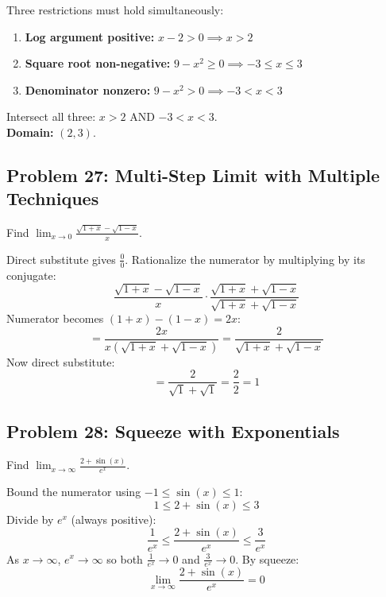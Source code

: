 \documentclass[11pt, letterpaper]{article}
\begin{document}
\begin{tcolorbox}[colback=examplebg, colframe=exampleborder,
  title={\bfseries Solution}, arc=3pt, boxrule=1pt]
Three restrictions must hold simultaneously:
\begin{enumerate}[noitemsep]
  \item \textbf{Log argument positive:} $x - 2 > 0 \implies x > 2$
  \item \textbf{Square root non-negative:} $9 - x^2 \geq 0 \implies -3 \leq x \leq 3$
  \item \textbf{Denominator nonzero:} $9 - x^2 > 0 \implies -3 < x < 3$
\end{enumerate}
Intersect all three: $x > 2$ AND $-3 < x < 3$.\\[3pt]
\textbf{Domain:} $(2, 3)$.
\end{tcolorbox}

\subsection*{Problem 27: Multi-Step Limit with Multiple Techniques}

Find $\displaystyle \lim_{x \to 0} \frac{\sqrt{1 + x} - \sqrt{1 - x}}{x}$.

\begin{tcolorbox}[colback=examplebg, colframe=exampleborder,
  title={\bfseries Solution}, arc=3pt, boxrule=1pt]
Direct substitute gives $\tfrac{0}{0}$. Rationalize the numerator by multiplying by its conjugate:
\[
\frac{\sqrt{1+x} - \sqrt{1-x}}{x} \cdot \frac{\sqrt{1+x} + \sqrt{1-x}}{\sqrt{1+x} + \sqrt{1-x}}
\]
Numerator becomes $(1+x) - (1-x) = 2x$:
\[
= \frac{2x}{x(\sqrt{1+x} + \sqrt{1-x})} = \frac{2}{\sqrt{1+x} + \sqrt{1-x}}
\]
Now direct substitute:
\[
= \frac{2}{\sqrt{1} + \sqrt{1}} = \frac{2}{2} = 1
\]
\end{tcolorbox}

\subsection*{Problem 28: Squeeze with Exponentials}

Find $\displaystyle \lim_{x \to \infty} \frac{2 + \sin(x)}{e^x}$.

\begin{tcolorbox}[colback=examplebg, colframe=exampleborder,
  title={\bfseries Solution}, arc=3pt, boxrule=1pt]
Bound the numerator using $-1 \leq \sin(x) \leq 1$:
\[
1 \leq 2 + \sin(x) \leq 3
\]
Divide by $e^x$ (always positive):
\[
\frac{1}{e^x} \leq \frac{2 + \sin(x)}{e^x} \leq \frac{3}{e^x}
\]
As $x \to \infty$, $e^x \to \infty$ so both $\tfrac{1}{e^x} \to 0$ and $\tfrac{3}{e^x} \to 0$. By squeeze:
\[
\lim_{x \to \infty} \frac{2 + \sin(x)}{e^x} = 0
\]
\end{tcolorbox}
\end{document}
